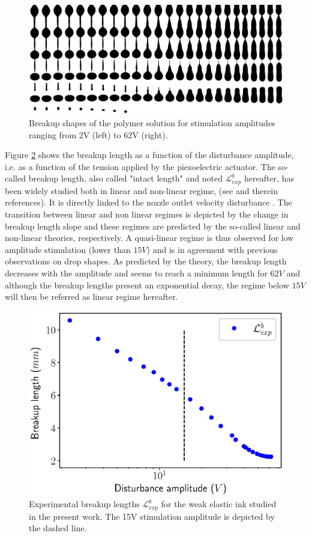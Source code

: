 \documentclass[onecolumn, 12pt]{asme2ej}
\begin{document}
\begin{figure}[h]
    \centering
    \includegraphics[width=15cm]{Figures/Fig2.eps}
    \caption{Breakup shapes of the polymer solution for stimulation amplitudes ranging from 2V (left) to 62V (right).} 
    \label{fig:expAll}
\end{figure}
Figure \ref{fig:LbInk} shows the breakup length as a function of the disturbance amplitude, i.e. as a function of the tension applied by the piezoelectric actuator. The so-called breakup length, also called "intact length" and noted $\mathcal{L}^b_{exp}$ hereafter, has been widely studied both in linear and non-linear regime, (see \cite{eggers2008physics} and therein references). It is directly linked to the nozzle outlet velocity disturbance \cite{pimbley1977satellite,rosello2018influence}. The transition between linear and non linear regimes is depicted by the change in breakup length slope and these regimes are predicted by the so-called linear and non-linear theories, respectively. A quasi-linear regime is thus observed for low  amplitude stimulation (lower than $15V$) and is in agreement with previous observations on drop shapes.
As predicted by the theory, the breakup length decreases with the amplitude and seems to reach a minimum length for $62V$ and although the breakup lengths present an exponential decay, the regime below $15V$ will then be referred as linear regime hereafter.

\begin{figure}[h]
    \centering
    \includegraphics[width=15cm]{Figures/Fig3.eps}
    \caption{Experimental breakup lengths $\mathcal{L}^b_{exp}$ for the weak elastic ink studied in the present work. The 15V stimulation amplitude is depicted by the dashed line.}
    \label{fig:LbInk}
\end{figure}
\end{document}
